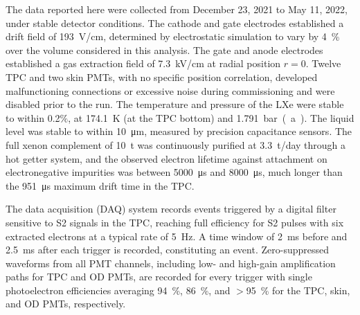 
The data reported here were collected from December 23, 2021 to May 11, 2022, under stable detector conditions. The cathode and gate electrodes \cite{LINEHANgrids} established a drift field of \SI{193}{V/cm}, determined by electrostatic simulation to vary by \SI{4}{\percent} over the volume considered in this analysis. The gate and anode electrodes established a gas extraction field of \SI{7.3}{kV/cm} at radial position $r=0$. Twelve TPC and two skin PMTs, with no specific position correlation, developed malfunctioning connections or excessive noise during commissioning and were disabled prior to the run. The temperature and pressure of the LXe were stable to within 0.2$\%$, at \SI{174.1}{\kelvin} (at the TPC bottom) and \SI{1.791}{bar(a)}. The liquid level was stable to within \SI{10}{\micro\meter}, measured by precision capacitance sensors. The full xenon complement of \SI{10}{t} was continuously purified at \SI{3.3}{t/day} through a hot getter system, and the observed electron lifetime against attachment on electronegative impurities was 
between \SI{5000}{\micro\s} and \SI{8000}{\micro\s}, much longer than the \SI{951}{\micro\s} maximum drift time in the TPC. 

The data acquisition (DAQ) system records events triggered by a digital filter sensitive to S2 signals in the TPC, reaching full efficiency for S2 pulses with six extracted electrons at a typical rate of \SI{5}{Hz}. A time window of \SI{2}{ms} before and \SI{2.5}{ms} after each trigger is recorded, constituting an event. Zero-suppressed waveforms from all PMT channels, including low- and high-gain amplification paths for TPC and OD PMTs, are recorded for every trigger with single photoelectron efficiencies averaging \SI{94}{\percent}, \SI{86}{\percent}, and $>$\SI{95}{\percent} for the TPC, skin, and OD PMTs, respectively.

